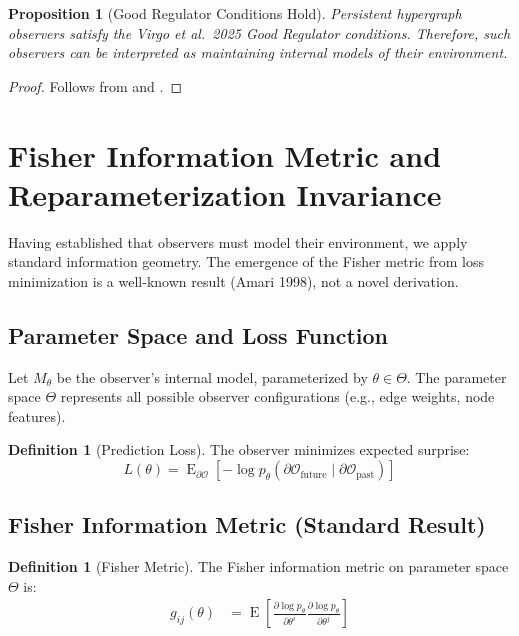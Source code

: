 \documentclass[11pt,a4paper]{article}
\theoremstyle{plain}
\newtheorem{proposition}[theorem]{Proposition}
\theoremstyle{definition}
\newtheorem{definition}[theorem]{Definition}
\theoremstyle{remark}
\DeclareMathOperator{\Exp}{E}
\newcommand{\del}{\partial}
\newcommand{\Ocal}{\mathcal{O}}
\newcommand{\boundary}{\partial}
\begin{document}
\begin{proposition}[Good Regulator Conditions Hold]
\label{prop:good_reg}
Persistent hypergraph observers satisfy the Virgo et al.~2025 Good Regulator conditions. Therefore, such observers can be interpreted as maintaining internal models of their environment.
\end{proposition}
\begin{proof}
Follows from  and .
\end{proof}


\section{Fisher Information Metric and Reparameterization Invariance}
\label{sec:fisher}

Having established that observers must model their environment, we apply standard information geometry. The emergence of the Fisher metric from loss minimization is a well-known result (Amari 1998), not a novel derivation.

\subsection{Parameter Space and Loss Function}

Let $M_\theta$ be the observer's internal model, parameterized by $\theta \in \Theta$. The parameter space $\Theta$ represents all possible observer configurations (e.g., edge weights, node features).

\begin{definition}[Prediction Loss]
The observer minimizes expected surprise:
\begin{equation}
L(\theta) = \Exp_{\boundary \Ocal} \left[ -\log p_\theta(\boundary \Ocal_{\text{future}} \mid \boundary \Ocal_{\text{past}}) \right]
\end{equation}
\end{definition}

\subsection{Fisher Information Metric (Standard Result)}

\begin{definition}[Fisher Metric]
\label{def:fisher}
The Fisher information metric on parameter space $\Theta$ is:
\begin{align}
g_{ij}(\theta) &= \Exp\left[ \frac{\del \log p_\theta}{\del \theta^i} \frac{\del \log p_\theta}{\del \theta^j} \right] \label{eq:fisher}
\end{align}
\end{definition}
\end{document}

